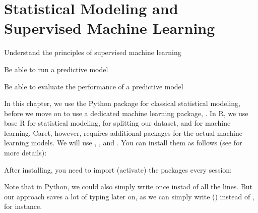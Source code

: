 \chapter{Statistical Modeling and Supervised Machine Learning}
\label{chap:introsml}

\begin{abstract}{Abstract} This chapter introduces the reader to the world of supervised machine learning. It starts by outlining how classical statistical techniques such as regression models can be used for prediction. It then provides an overview of frequently-used techniques from Na\"ive Bayes classifiers to neural networks.
\end{abstract}



\begin{objectives}
\item Understand the principles of supervised machine learning
\item Be able to run a predictive model
\item Be able to evaluate the performance of a predictive model
\end{objectives}

\newpage
\begin{feature}

In this chapter, we use the Python package  for classical statistical modeling, before we move on to use a dedicated machine learning package, . In R, we use base R for statistical modeling,  for splitting our dataset, and  for machine learning. Caret, however, requires additional packages for the actual machine learning models. We will use , , and . You can install them as follows (see  for more details):


\noindent After installing, you need to import (activate) the packages every session:


Note that in Python, we could also simply write  once instad of all the  lines. But our approach saves a lot of typing later on, as we can simply write () instead of , for instance.
\end{feature}






